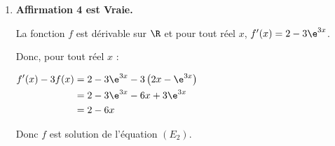 \begin{enumerate}
\begin{enumerate}
	Or $\lim\limits_{x\to +\infty} \dfrac{1}{x} =0 $ donc, par somme,  $\lim\limits_{x\to +\infty }1 -\dfrac{1}{x} =1 $ et  $\lim\limits_{x\to +\infty }1 +\dfrac{1}{x} =1 $. 
	
	D'après le théorème des gendarmes, on a donc : $\lim\limits_{x\to +\infty }f(x) =1 $. 
	
	C'est à dire, la droite d'équation $y=1$ est une asymptote horizontale à la courbe représentative de la fonction $f$ au voisinage de $+\infty$.
	\end{enumerate}
%	


	\item 	\textbf{Affirmation 4  est Vraie.} 
	
	
	 La fonction $f$ est dérivable sur $\R$ et pour tout réel $x$, $f'(x) = 2 -3 \e^{3x}$.
	
	Donc, pour tout réel $x$ : 
	
	$\begin{aligned} f'(x) -3f(x) &=  2 -3 \e^{3x} - 3 \left(2x-\e^{3x}\right) \\
		 &= 2 -3 \e^{3x} - 6x +3 \e^{3x} \\
		 &= 2  - 6x 
		 \end{aligned}$ 
		 
		 Donc $f$ est solution de l'équation $(E_{2})$.
	
\end{enumerate}
